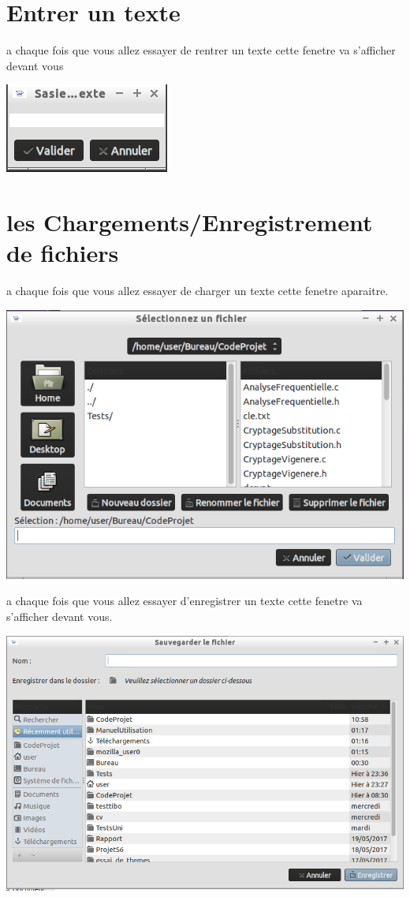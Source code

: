\documentclass[a4]{article}
\begin{document}
	\section{Entrer un texte}
		a chaque fois que vous allez essayer de rentrer un texte cette fenetre va s'afficher devant vous
		\begin{center}\includegraphics[scale=0.4]{21.png}\end{center}
	\section{les Chargements/Enregistrement de fichiers}
		a chaque fois que vous allez essayer de charger un texte cette fenetre aparaitre.
		\begin{center}\includegraphics[scale=0.4]{19.png}\end{center}
		a chaque fois que vous allez essayer d'enregistrer un texte cette fenetre va s'afficher devant vous.
		\begin{center}\includegraphics[scale=0.4]{20.png}\end{center}
\end{document}
